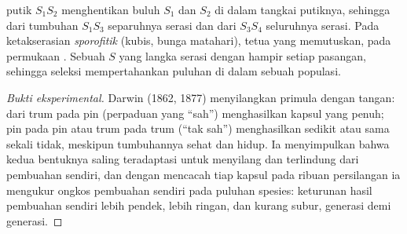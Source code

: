 \begin{proposition}
putik $S_1S_2$ menghentikan buluh $S_1$ dan $S_2$ di dalam tangkai
putiknya, sehingga  dari tumbuhan $S_1S_3$ separuhnya serasi
dan dari $S_3S_4$ seluruhnya serasi. Pada ketakserasian
\emph{sporofitik} (kubis, bunga matahari),   tetua
 yang memutuskan, pada permukaan . Sebuah
 $S$ yang langka serasi dengan hampir setiap pasangan, sehingga
seleksi mempertahankan puluhan  di dalam sebuah populasi.
\end{proposition}
\begin{proof}[Bukti eksperimental]
Darwin (1862, 1877) menyilangkan  primula dengan tangan:  dari  trum pada  pin (perpaduan yang ``sah'')
menghasilkan kapsul yang penuh; pin pada pin atau trum pada trum
(``tak sah'') menghasilkan sedikit  atau sama sekali tidak,
meskipun tumbuhannya sehat dan  hidup. Ia menyimpulkan
bahwa kedua bentuknya saling teradaptasi untuk menyilang dan terlindung
dari pembuahan sendiri, dan dengan mencacah  tiap kapsul pada
ribuan persilangan ia mengukur ongkos pembuahan sendiri pada puluhan
spesies: keturunan hasil pembuahan sendiri lebih pendek, lebih ringan,
dan kurang subur, generasi demi generasi.
\end{proof}


